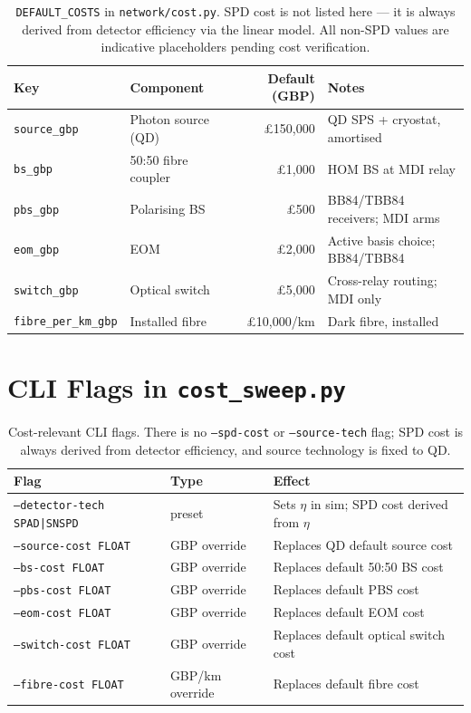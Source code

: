 \documentclass[12pt,a4paper]{article}
\begin{document}
\begin{table}[h!]
\centering
\begin{tabular}{llrl}
\toprule
Key & Component & Default (GBP) & Notes \\
\midrule
\texttt{source\_gbp}         & Photon source (QD)  & \pounds150{,}000  & QD SPS + cryostat, amortised \\
\texttt{bs\_gbp}             & 50:50 fibre coupler & \pounds1{,}000    & HOM BS at MDI relay \\
\texttt{pbs\_gbp}            & Polarising BS       & \pounds500        & BB84/TBB84 receivers; MDI arms \\
\texttt{eom\_gbp}            & EOM                 & \pounds2{,}000    & Active basis choice; BB84/TBB84 \\
\texttt{switch\_gbp}         & Optical switch      & \pounds5{,}000    & Cross-relay routing; MDI only \\
\texttt{fibre\_per\_km\_gbp} & Installed fibre     & \pounds10{,}000/km & Dark fibre, installed \\
\bottomrule
\end{tabular}
\caption{\texttt{DEFAULT\_COSTS} in \texttt{network/cost.py}. SPD cost is not
listed here --- it is always derived from detector efficiency via the linear
model. All non-SPD values are indicative placeholders pending cost verification.}
\end{table}


\section{CLI Flags in \texttt{cost\_sweep.py}}

\begin{table}[h!]
\centering
\begin{tabular}{lll}
\toprule
Flag & Type & Effect \\
\midrule
\texttt{--detector-tech SPAD|SNSPD} & preset & Sets $\eta$ in sim; SPD cost derived from $\eta$ \\
\texttt{--source-cost FLOAT} & GBP override & Replaces QD default source cost \\
\texttt{--bs-cost FLOAT}     & GBP override & Replaces default 50:50 BS cost \\
\texttt{--pbs-cost FLOAT}    & GBP override & Replaces default PBS cost \\
\texttt{--eom-cost FLOAT}    & GBP override & Replaces default EOM cost \\
\texttt{--switch-cost FLOAT} & GBP override & Replaces default optical switch cost \\
\texttt{--fibre-cost FLOAT}  & GBP/km override & Replaces default fibre cost \\
\bottomrule
\end{tabular}
\caption{Cost-relevant CLI flags. There is no \texttt{--spd-cost} or
\texttt{--source-tech} flag; SPD cost is always derived from detector
efficiency, and source technology is fixed to QD.}
\end{table}
\end{document}
